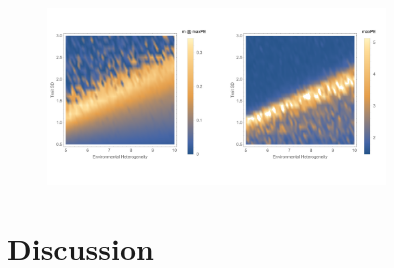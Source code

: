 \documentclass[onecolumn,preprintnumbers,amsmath,amssymb,superscriptaddress]{revtex4}
\begin{document}
\begin{figure}[h]
\centering
\includegraphics[width=0.8\textwidth]{fig_HSDcomb.png}
\caption{}
\end{figure}


\section*{Discussion}
\end{document}
